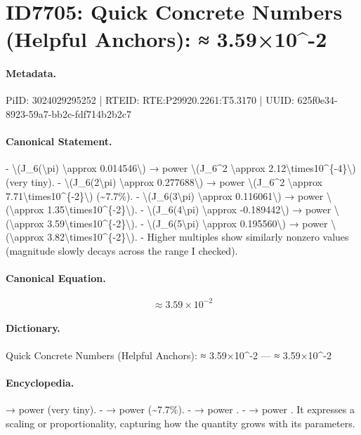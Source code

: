 \section*{ID7705: Quick Concrete Numbers (Helpful Anchors): ≈ 3.59×10\textasciicircum{}-2}
\paragraph{Metadata.}
PiID: 3024029295252 | RTEID: RTE:P29920.2261:T5.3170 | UUID: 625f0e34-8923-59a7-bb2c-fdf714b2b2c7

\paragraph{Canonical Statement.}
- \textbackslash{}(J\_6(\textbackslash{}pi) \textbackslash{}approx 0.014546\textbackslash{}) → power \textbackslash{}(J\_6\textasciicircum{}2 \textbackslash{}approx 2.12\textbackslash{}times10\textasciicircum{}\{-4\}\textbackslash{}) (very tiny). - \textbackslash{}(J\_6(2\textbackslash{}pi) \textbackslash{}approx 0.277688\textbackslash{}) → power \textbackslash{}(J\_6\textasciicircum{}2 \textbackslash{}approx 7.71\textbackslash{}times10\textasciicircum{}\{-2\}\textbackslash{}) (\textasciitilde{}7.7\%). - \textbackslash{}(J\_6(3\textbackslash{}pi) \textbackslash{}approx 0.116061\textbackslash{}) → power \textbackslash{}(\textbackslash{}approx 1.35\textbackslash{}times10\textasciicircum{}\{-2\}\textbackslash{}). - \textbackslash{}(J\_6(4\textbackslash{}pi) \textbackslash{}approx -0.189442\textbackslash{}) → power \textbackslash{}(\textbackslash{}approx 3.59\textbackslash{}times10\textasciicircum{}\{-2\}\textbackslash{}). - \textbackslash{}(J\_6(5\textbackslash{}pi) \textbackslash{}approx 0.195560\textbackslash{}) → power \textbackslash{}(\textbackslash{}approx 3.82\textbackslash{}times10\textasciicircum{}\{-2\}\textbackslash{}). - Higher multiples show similarly nonzero values (magnitude slowly decays across the range I checked).

\paragraph{Canonical Equation.}
\[
\approx 3.59\times10^{-2}
\]

\paragraph{Dictionary.}
Quick Concrete Numbers (Helpful Anchors): ≈ 3.59×10\textasciicircum{}-2 — ≈ 3.59×10\textasciicircum{}-2

\paragraph{Encyclopedia.}
→ power (very tiny). - → power (\textasciitilde{}7.7\%). - → power . - → power . It expresses a scaling or proportionality, capturing how the quantity grows with its parameters.
